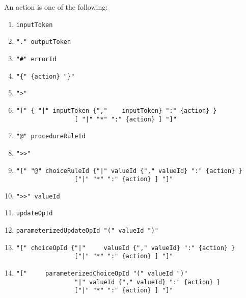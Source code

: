An action is one of the following:
\begin{enumerate}
\item 
\begin{verbatim}
inputToken
\end{verbatim}
\item 
\begin{verbatim}
"." outputToken
\end{verbatim}
           
\item 
\begin{verbatim}
"#" errorId
\end{verbatim}
\item 
\begin{verbatim}
"{" {action} "}"
\end{verbatim}
\item 
\begin{verbatim}
">"
\end{verbatim}
\item 
\begin{verbatim}
"[" { "|" inputToken {","    inputToken} ":" {action} }
                [ "|" "*" ":" {action} ] "]"
\end{verbatim}
\item 
\begin{verbatim}
"@" procedureRuleId
\end{verbatim}
\item 
\begin{verbatim}
">>"
\end{verbatim}
\item 
\begin{verbatim}
"[" "@" choiceRuleId {"|" valueId {"," valueId} ":" {action} }
                ["|" "*" ":" {action} ] "]"
\end{verbatim}
                  
\item 
\begin{verbatim}
">>" valueId
\end{verbatim}
\item 
\begin{verbatim}
updateOpId
\end{verbatim}
\item 
\begin{verbatim}
parameterizedUpdateOpId "(" valueId ")"
\end{verbatim}
\item 
\begin{verbatim}
"[" choiceOpId {"|"     valueId {"," valueId} ":" {action} }
                ["|" "*" ":" {action} ] "]"
\end{verbatim}
\item 
\begin{verbatim}
"["     parameterizedChoiceOpId "(" valueId ")"
                "|" valueId {"," valueId} ":" {action} }
                ["|" "*" ":" {action} ] "]"
\end{verbatim}
\end{enumerate}


